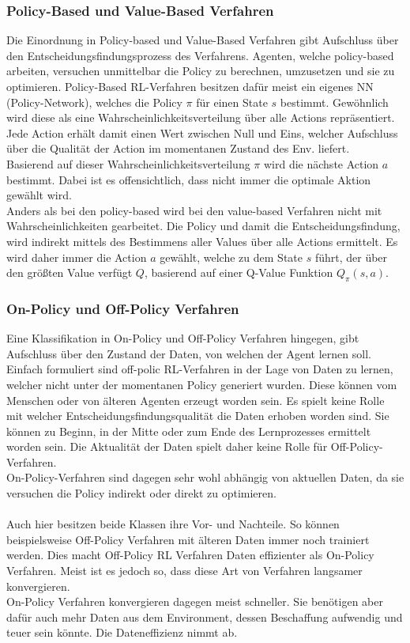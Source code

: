 \subsubsection{Policy-Based und Value-Based Verfahren} \label{sec:RL_policy_value}
Die Einordnung in Policy-based und Value-Based Verfahren gibt Aufschluss über den Entscheidungsfindungsprozess des Verfahrens.
Agenten, welche policy-based arbeiten, versuchen unmittelbar die Policy zu berechnen, umzusetzen und sie zu optimieren. Policy-Based RL-Verfahren besitzen dafür meist ein eigenes NN (Policy-Network), welches die Policy $\pi$ für einen State $s$ bestimmt.
Gewöhnlich wird diese als eine Wahrscheinlichkeitsverteilung über alle Actions repräsentiert. Jede Action erhält damit einen Wert zwischen Null und Eins, welcher Aufschluss über die Qualität der Action im momentanen Zustand des Env. liefert. \cite[S. 100]{DRL_Lapan} \\
Basierend auf dieser Wahrscheinlichkeitsverteilung $\pi$ wird die nächste Action $a$ bestimmt. Dabei ist es offensichtlich, dass nicht immer die optimale Aktion gewählt wird.\\
Anders als bei den policy-based wird bei den value-based Verfahren nicht mit Wahrscheinlichkeiten gearbeitet. Die Policy und damit die Entscheidungsfindung, wird indirekt mittels des Bestimmens aller Values über alle Actions ermittelt. Es wird daher immer die Action $a$ gewählt, welche zu dem State $s$ führt, der über den größten Value verfügt $Q$, basierend auf einer Q-Value Funktion $Q_\pi(s,a)$. \cite[S. 100]{DRL_Lapan}

\subsubsection{On-Policy und Off-Policy Verfahren}
Eine Klassifikation in On-Policy und Off-Policy Verfahren hingegen, gibt Aufschluss über den Zustand der Daten, von welchen der Agent lernen soll. 
Einfach formuliert sind off-polic RL-Verfahren in der Lage von Daten zu lernen, welcher nicht unter der momentanen Policy generiert wurden. Diese können vom Menschen oder von älteren Agenten erzeugt worden sein. Es spielt keine Rolle mit welcher Entscheidungsfindungsqualität die Daten erhoben worden sind. Sie können zu Beginn, in der Mitte oder zum Ende des Lernprozesses ermittelt worden sein. Die Aktualität der Daten spielt daher keine Rolle für Off-Policy-Verfahren. \cite[S. 210 f.]{DRL_Lapan}\\
On-Policy-Verfahren sind dagegen sehr wohl abhängig von aktuellen Daten, da sie versuchen die Policy indirekt oder direkt zu optimieren.\\
\\Auch hier besitzen beide Klassen ihre Vor- und Nachteile. So können beispielsweise Off-Policy Verfahren mit älteren Daten immer noch trainiert werden. Dies macht Off-Policy RL Verfahren Daten effizienter als On-Policy Verfahren. Meist ist es jedoch so, dass diese Art von Verfahren langsamer konvergieren.\\
On-Policy Verfahren konvergieren dagegen meist schneller. Sie benötigen aber dafür auch mehr Daten aus dem Environment, dessen Beschaffung aufwendig und teuer sein könnte. Die Dateneffizienz nimmt ab.\cite[S. 210 f.]{DRL_Lapan}

